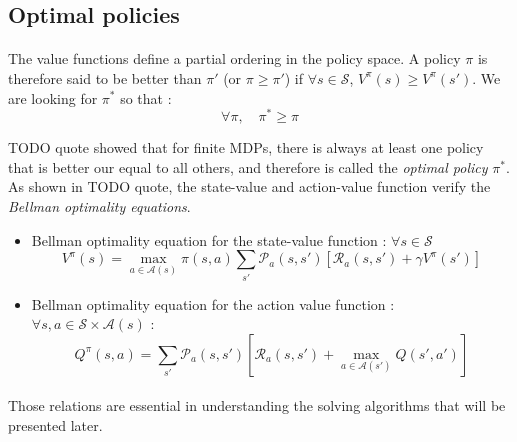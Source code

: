 \documentclass[a4paper]{report}
\begin{document}
{{			\subsection{Optimal policies}
			{
				\paragraph{} The value functions define a partial ordering in the policy space. A policy $\pi$ is therefore said to be better than $\pi'$ (or $\pi\geq \pi'$) if $\forall{s}\in\mathcal{S}$, $V^\pi(s) \geq V^\pi(s')$. We are looking for $\pi^*$ so that : 
				\begin{equation}
					\forall\pi, \quad \pi^* \geq \pi 
				\end{equation}
				
				TODO quote showed that for finite MDPs, there is always at least one policy that is better our equal to all others, and therefore is called the \emph{optimal policy} $\pi^*$. As shown in TODO quote, the state-value and action-value function verify the \emph{Bellman optimality equations}. 
				
				\vspace{10pt}
				
				{
					\begin{itemize}[label=$\triangleright$]
						\item Bellman optimality equation for the state-value function : $\forall s \in\mathcal{S}$ 
						\begin{equation}
							V^\pi(s) = \max_{a\in\mathcal{A}(s)}\pi(s,a)\sum_{s'} \mathcal{P}_a(s,s')\left[\mathcal{R}_a(s,s') + \gamma V^\pi(s')\right]
						\end{equation}
						\item Bellman optimality equation for the action value function : $\forall{s,a}\in\mathcal{S}\times\mathcal{A}(s)$ : 
						\begin{equation}
							Q^\pi(s,a) = \sum_{s'}\mathcal{P}_a(s,s')\left[ \mathcal{R}_a(s,s') + \max_{a\in\mathcal{A}(s')} Q(s',a') \right]
						\end{equation}
					\end{itemize}
				}
				
				\paragraph{} Those relations are essential in understanding the solving algorithms that will be presented later. 
			}
		}


}
\end{document}
